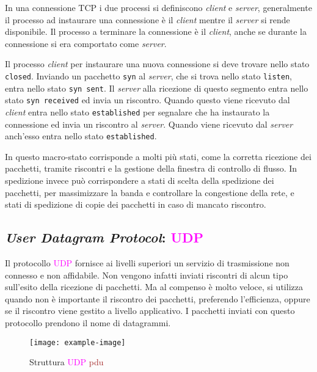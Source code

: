 \documentclass{article}
\numberwithin{equation}{subsection}
\begin{document}
In una connessione \textcolor{Bittersweet}{TCP} i due processi si definiscono \textit{client} e \textit{server}, generalmente il processo ad instaurare una connessione è il \textit{client} mentre il \textit{server} si rende disponibile. Il processo a terminare la connessione è il \textit{client}, anche se durante la connessione si era comportato come \textit{server}. 

Il processo \textit{client} per instaurare una nuova connessione si deve trovare nello stato \verb|closed|. Inviando un pacchetto \verb|syn| al \textit{server}, che si trova nello stato \verb|listen|, entra nello stato \verb|syn sent|. Il \textit{server} alla ricezione di questo segmento entra nello stato \verb|syn received| ed invia un riscontro. Quando questo viene ricevuto dal \textit{client} entra nello stato \verb|established| per segnalare che ha instaurato la connessione ed invia un riscontro al \textit{server}. Quando viene ricevuto dal \textit{server} anch'esso entra nello stato \verb|established|. 

In questo macro-stato corrisponde a molti più stati, come la corretta ricezione dei pacchetti, tramite riscontri e la gestione della finestra di controllo di flusso. 
In spedizione invece può corrispondere a stati di scelta della spedizione dei pacchetti, per massimizzare la banda e controllare la congestione della rete, e stati di spedizione di copie dei pacchetti in caso di mancato riscontro. 

\subsection{\textit{User Datagram Protocol}: \textcolor{Fuchsia}{UDP}}

Il protocollo \textcolor{Fuchsia}{UDP} fornisce ai livelli superiori un servizio di trasmissione non connesso e non affidabile. Non vengono infatti inviati riscontri di alcun tipo sull'esito della ricezione di pacchetti. 
Ma al compenso è molto veloce, si utilizza quando non è importante il riscontro dei pacchetti, preferendo l'efficienza, oppure se il riscontro viene gestito a livello applicativo. I pacchetti inviati con questo protocollo prendono il nome di datagrammi. 

\begin{figure}[H]%
    \centering%
    \texttt{[image: example-image]}%
    \caption{Struttura \textcolor{Fuchsia}{UDP} \textcolor{Brown}{pdu}}%
\end{figure}
\end{document}
